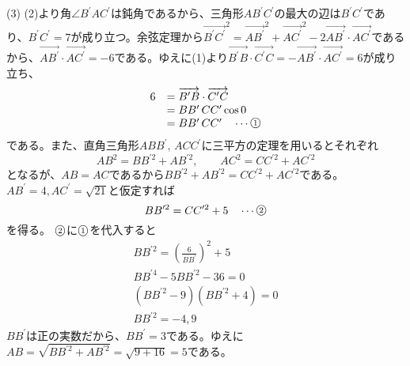 \documentclass[./main]{subfiles}
\begin{document}
(3)
 (2)より角$\angle B^\prime A C^\prime$は鈍角であるから、三角形$A B^\prime C^\prime$の最大の辺は$B^\prime C^\prime$であり、$B^\prime C^\prime = 7$が成り立つ。余弦定理から$\overrightarrow{B^\prime C^\prime}^2=\overrightarrow{AB^\prime}^2+\overrightarrow{AC^\prime}^2-2\overrightarrow{AB^\prime}\cdot\overrightarrow{AC^\prime}$であるから、$\overrightarrow{AB^\prime}\cdot\overrightarrow{AC^\prime}=-6$である。ゆえに(1)より$\overrightarrow{B^\prime B}\cdot\overrightarrow{C^\prime C}=-\overrightarrow{AB^\prime}\cdot\overrightarrow{AC^\prime}=6$が成り立ち、
 \renewcommand{\arraystretch}{1.2}
\[
\begin{array}{rl}
6&=\overrightarrow{B^\prime B}\cdot\overrightarrow{C^\prime C}\\
 &=BB^\prime \,CC^\prime\cos 0\\
 &=B B^\prime \,C C^\prime \quad\cdots \raise0.2ex\hbox{\textcircled{\scriptsize{1}}}
\end{array}
\]
である。また、直角三角形$ABB^\prime,\, ACC^\prime$に三平方の定理を用いるとそれぞれ\[
AB^2=BB^{\prime 2}+AB^{\prime 2},\qquad AC^2=CC^{\prime 2}+AC^{\prime 2}\]
となるが、$AB=AC$であるから$BB^{\prime 2}+AB^{\prime 2}=CC^{\prime 2}+AC^{\prime 2}$である。$AB^{\prime}=4, AC^{\prime}=\sqrt{21}$と仮定すれば\[
BB^{\prime 2}=CC^{\prime 2}+5\quad\cdots \raise0.2ex\hbox{\textcircled{\scriptsize{2}}}\]を得る。
$\raise0.2ex\hbox{\textcircled{\scriptsize{2}}}$に$\raise0.2ex\hbox{\textcircled{\scriptsize{1}}}$を代入すると
\renewcommand{\arraystretch}{1.7}
\[
\begin{array}{c}
BB^{\prime 2}=\displaystyle\left(\frac{6}{BB^{\prime}}\right)^{\!\!2}+5\\
BB^{\prime 4}-5BB^{\prime 2}-36=0\\
(BB^{\prime 2}-9)(BB^{\prime 2}+4)=0\\
BB^{\prime 2}=-4, 9
\end{array}
\]$BB^{\prime}$は正の実数だから、$BB^{\prime}=3$である。ゆえに$AB=\sqrt{BB^{\prime 2}+AB^{\prime 2}}=\sqrt{9+16}=5$である。
\renewcommand{\arraystretch}{1.0}
\end{document}
